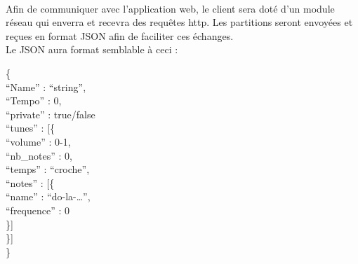 \paragraph{}
	Afin de communiquer avec l'application web, le client sera doté d'un module réseau qui enverra et 		
	recevra des requêtes http. Les partitions seront envoyées et reçues en format JSON afin de faciliter 
	ces échanges. \\
	Le JSON aura format semblable à ceci :
	
		\begin{tt}
			\{ \\
				“Name” : “string”, \\
				“Tempo” : 0, \\
				“private” : true/false \\
				“tunes” : [\{ \\
					“volume” : 0-1, \\
					“nb\_notes” : 0, \\
					“temps” : “croche”, \\
					“notes” : [\{ \\
						“name” : “do-la-…”, \\
						“frequence” : 0 \\
					\}] \\
				\}]	 \\
			\}
		\end{tt}